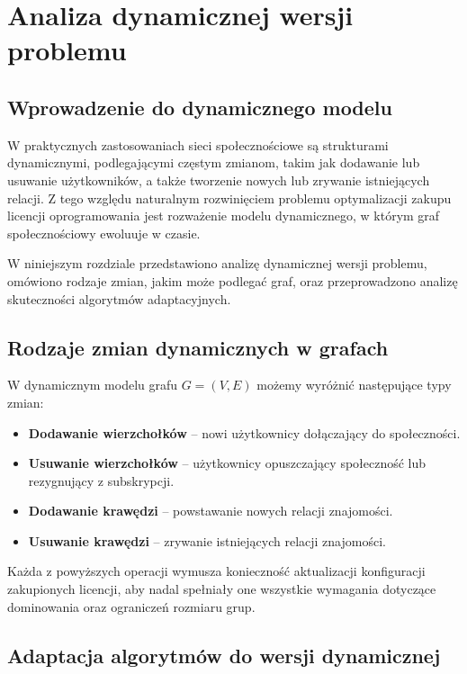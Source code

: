 \chapter{Analiza dynamicznej wersji problemu}

\section{Wprowadzenie do dynamicznego modelu}

W praktycznych zastosowaniach sieci społecznościowe są strukturami dynamicznymi, podlegającymi częstym zmianom, takim jak dodawanie lub usuwanie użytkowników, a także tworzenie nowych lub zrywanie istniejących relacji. Z tego względu naturalnym rozwinięciem problemu optymalizacji zakupu licencji oprogramowania jest rozważenie modelu dynamicznego, w którym graf społecznościowy ewoluuje w czasie.

W niniejszym rozdziale przedstawiono analizę dynamicznej wersji problemu, omówiono rodzaje zmian, jakim może podlegać graf, oraz przeprowadzono analizę skuteczności algorytmów adaptacyjnych.

\section{Rodzaje zmian dynamicznych w grafach}

W dynamicznym modelu grafu \(G = (V, E)\) możemy wyróżnić następujące typy zmian:

\begin{itemize}
    \item \textbf{Dodawanie wierzchołków} – nowi użytkownicy dołączający do społeczności.
    \item \textbf{Usuwanie wierzchołków} – użytkownicy opuszczający społeczność lub rezygnujący z subskrypcji.
    \item \textbf{Dodawanie krawędzi} – powstawanie nowych relacji znajomości.
    \item \textbf{Usuwanie krawędzi} – zrywanie istniejących relacji znajomości.
\end{itemize}

Każda z powyższych operacji wymusza konieczność aktualizacji konfiguracji zakupionych licencji, aby nadal spełniały one wszystkie wymagania dotyczące dominowania oraz ograniczeń rozmiaru grup.

\section{Adaptacja algorytmów do wersji dynamicznej}

